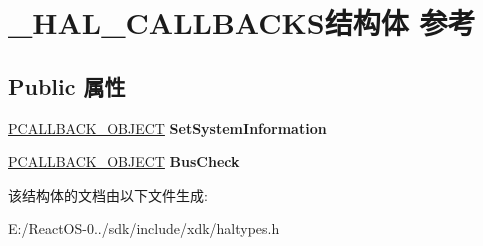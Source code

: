 \hypertarget{struct___h_a_l___c_a_l_l_b_a_c_k_s}{}\section{\+\_\+\+H\+A\+L\+\_\+\+C\+A\+L\+L\+B\+A\+C\+K\+S结构体 参考}
\label{struct___h_a_l___c_a_l_l_b_a_c_k_s}
\subsection*{Public 属性}
\begin{DoxyCompactItemize}
\item 
\mbox{\label{struct___h_a_l___c_a_l_l_b_a_c_k_s_aa51b2d27a320e590cb4ae6353fbf0f17}} 
\hyperlink{struct___c_a_l_l_b_a_c_k___o_b_j_e_c_t}{P\+C\+A\+L\+L\+B\+A\+C\+K\+\_\+\+O\+B\+J\+E\+CT} {\bfseries Set\+System\+Information}
\item 
\mbox{\label{struct___h_a_l___c_a_l_l_b_a_c_k_s_aeb55aac2d353f9474fc1ef713056bbe8}} 
\hyperlink{struct___c_a_l_l_b_a_c_k___o_b_j_e_c_t}{P\+C\+A\+L\+L\+B\+A\+C\+K\+\_\+\+O\+B\+J\+E\+CT} {\bfseries Bus\+Check}
\end{DoxyCompactItemize}


该结构体的文档由以下文件生成\+:\begin{DoxyCompactItemize}
\item 
E\+:/\+React\+O\+S-\/0../sdk/include/xdk/haltypes.\+h\end{DoxyCompactItemize}
